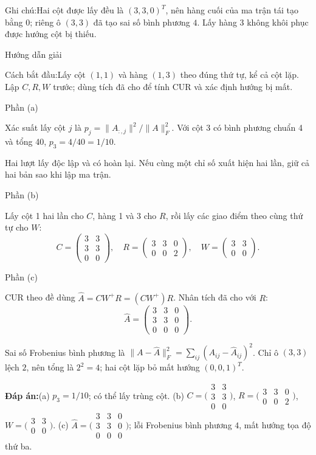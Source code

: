 \documentclass[10pt,a4paper,twocolumn]{article}
\makeatletter
\newcommand{\maptag}[1]{\phantomsection\@bsphack\protected@write\@auxout{}{\string\newlabel{#1}{{}{\thepage}{}{\@currentHref}{}}}\@esphack}
\newcommand{\key}[1]{#1:\enspace}
\newcommand{\solutionprompt}[1]{\par\addvspace{1pt}\noindent\key{Cách bắt đầu}#1\par\addvspace{2pt}}
\newcommand{\examnote}[1]{\par\addvspace{2pt}\noindent\key{Ghi chú}#1\par\addvspace{3pt}}
\newcommand{\blocklabel}[1]{\par\noindent#1\par\nobreak}
\newcommand{\answer}[1]{%
  \par\addvspace{3pt}%
  \blocklabel{#1Hướng dẫn giải}}
\newcommand{\finalanswer}[1]{%
  \par\addvspace{3pt}\noindent\textbf{Đáp án:}\nobreak\enspace#1\par}
\newcommand{\guidepart}[1]{%
  \par\addvspace{1.5pt}%
  \blocklabel{Phần #1}}
\makeatother
\begin{document}
\examnote{Hai cột được lấy đều là $(3,3,0)^T$, nên hàng cuối của ma trận tái tạo bằng 0; riêng ô $(3,3)$ đã tạo sai số bình phương $4$. Lấy hàng 3 không khôi phục được hướng cột bị thiếu.}
\answer{\maptag{answer:Pr12}}
\solutionprompt{Lấy cột $(1,1)$ và hàng $(1,3)$ theo đúng thứ tự, kể cả cột lặp. Lập $C,R,W$ trước; dùng tích đã cho để tính CUR và xác định hướng bị mất.}
\guidepart{(a)}
\begin{guidesteps}
\item Xác suất lấy cột $j$ là $p_j=\|A_{:,j}\|^2/\|A\|_F^2$. Với cột 3 có bình phương chuẩn 4 và tổng 40, $p_3=4/40=1/10$.
\item Hai lượt lấy độc lập và có hoàn lại. Nếu cùng một chỉ số xuất hiện hai lần, giữ cả hai bản sao khi lập ma trận.
\end{guidesteps}
\guidepart{(b)}
\begin{guidesteps}
\item Lấy cột 1 hai lần cho $C$, hàng 1 và 3 cho $R$, rồi lấy các giao điểm theo cùng thứ tự cho $W$:
\[
C=\begin{pmatrix}3&3\\3&3\\0&0\end{pmatrix},\quad
R=\begin{pmatrix}3&3&0\\0&0&2\end{pmatrix},\quad
W=\begin{pmatrix}3&3\\0&0\end{pmatrix}.
\]
\end{guidesteps}
\guidepart{(c)}
\begin{guidesteps}
\item CUR theo đề dùng $\widehat A=CW^+R=(CW^+)R$. Nhân tích đã cho với $R$:
\[
\widehat A=\begin{pmatrix}3&3&0\\3&3&0\\0&0&0\end{pmatrix}.
\]
\item Sai số Frobenius bình phương là $\|A-\widehat A\|_F^2=\sum_{ij}(A_{ij}-\widehat A_{ij})^2$. Chỉ ô $(3,3)$ lệch $2$, nên tổng là $2^2=4$; hai cột lặp bỏ mất hướng $(0,0,1)^T$.
\end{guidesteps}
\finalanswer{(a) $p_3=1/10$; có thể lấy trùng cột. (b) $C=\bigl(\begin{smallmatrix}3&3\\3&3\\0&0\end{smallmatrix}\bigr)$, $R=\bigl(\begin{smallmatrix}3&3&0\\0&0&2\end{smallmatrix}\bigr)$, $W=\bigl(\begin{smallmatrix}3&3\\0&0\end{smallmatrix}\bigr)$. (c) $\widehat A=\bigl(\begin{smallmatrix}3&3&0\\3&3&0\\0&0&0\end{smallmatrix}\bigr)$; lỗi Frobenius bình phương $4$, mất hướng tọa độ thứ ba.}
\end{document}
